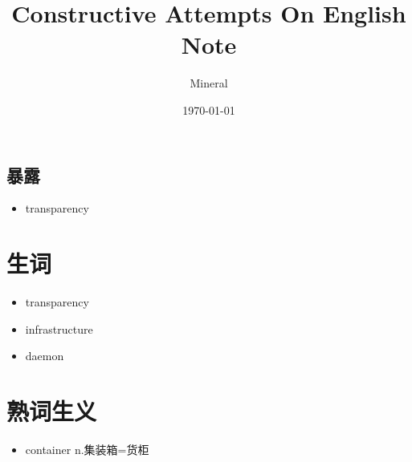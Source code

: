 \documentclass[utf8]{ctexart}
\author{Mineral}
\title{Constructive Attempts On English Note }
\date {\today}
\begin{document}
		\maketitle
		\subsection{暴露}
		\begin{itemize}
						\item transparency 
		\end{itemize}
		\section{生词}
		\begin{itemize}
						\item transparency
						\item infrastructure	
						\item daemon	
							
		\end{itemize}
		\section{熟词生义}
		\begin{itemize}
						\item container n.集装箱=货柜
		\end{itemize}
		
\end{document}
